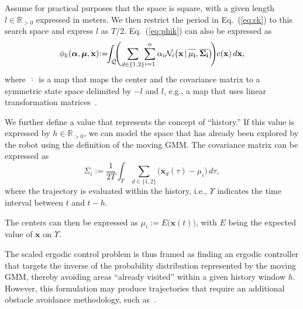 \documentclass[letterpaper,10pt,conference,twoside]{IEEEtran}
\theoremstyle{definition}
\begin{document}
Assume for practical purposes that the space is square, with a given length $l\in\mathbb{R}_{>0}$ expressed in meters. We then restrict the period in Eq.~(\ref{eq:ck}) to this search space and express $l$ as $T/2$. Eq.~(\ref{eq:phik}) can also be expressed as 
\begin{equation}
  \phi_k(\boldsymbol{\alpha},\boldsymbol{\mu},\mathbf{x})\hspace*{-.6ex}:=\hspace*{-1ex}\int_{\mathcal{Q}}{\hspace*{-1ex}\Bigg(\hspace*{-.3ex}\sum_{d\in\{1,2\}}\hspace*{-.5ex}\sum_{i=1}^n\alpha_i\mathcal{N}_i\big(\mathbf{x\,|\,\overline{\rule{0pt}{2.4mm}{\mu_i}},\overline{\Sigma_i}}\big)\hspace*{-.5ex}\Bigg)\hspace*{-.1ex}c(\mathbf{x})\,d\mathbf{x}},
\end{equation}
where $\overline{\,\cdot\,}$ is a map that maps the center and the covariance matrix to a symmetric state space delimited by $-l$ and $l$, e.g., a map that uses linear transformation matrices~\cite{calinon2020mixture}.

We further define a value that represents the concept of ``history.'' If this value is expressed by $h\in\mathbb{R}_{>0}$, we can model the space that has already been explored by the robot using the definition of the moving GMM. The covariance matrix can be expressed as 
\begin{equation}
  \Sigma_i:=\frac{1}{2T}\int_\Upsilon\sum_{d\in\{1,2\}}{\big(\mathbf{x}_d(\tau)-\mu_i\big)}\,d\tau,
\end{equation}
where the trajectory is evaluated within the history, i.e., $\Upsilon$ indicates the time interval between $t$ and $t-h$.

The centers can then be expressed as $\mu_i:=E\big(\mathbf{x}(t)\big)$, with $E$ being the expected value of $\mathbf{x}$ on $\Upsilon$. 

The scaled ergodic control problem is thus framed as finding an ergodic controller that targets the inverse of the probability distribution represented by the moving GMM, thereby avoiding areas “already visited” within a given history window $h$. However, this formulation may produce trajectories that require an additional obstacle avoidance methodology, such as~\cite{lerch2023safety}.
\end{document}
